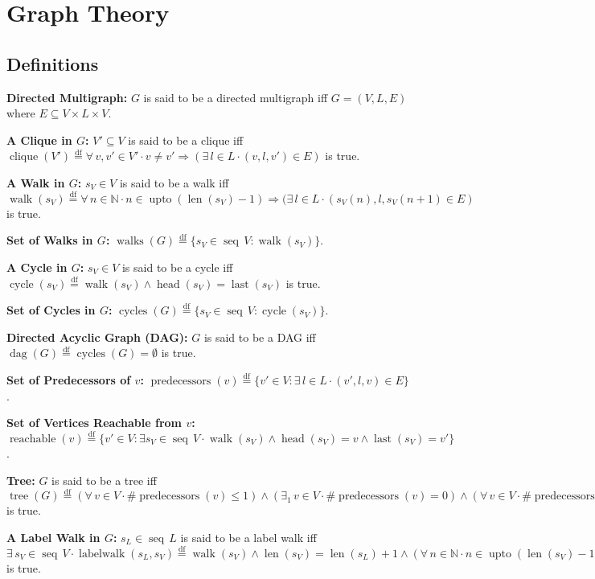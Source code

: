 \documentclass[12pt]{article}
\newcommand{\dfeq}{\stackrel{\text{df}}{=}}
\DeclareMathOperator{\jdag}{dag}
\DeclareMathOperator{\jseq}{seq}
\DeclareMathOperator{\jwalk}{walk}
\DeclareMathOperator{\jlabelwalk}{labelwalk}
\DeclareMathOperator{\jpredecessors}{predecessors}
\DeclareMathOperator{\jreachable}{reachable}
\DeclareMathOperator{\jcycle}{cycle}
\DeclareMathOperator{\jcycles}{cycles}
\DeclareMathOperator{\jclique}{clique}
\DeclareMathOperator{\jtree}{tree}
\DeclareMathOperator{\jwalks}{walks}
\DeclareMathOperator{\jupto}{upto}
\DeclareMathOperator{\jhead}{head}
\DeclareMathOperator{\jlast}{last}
\DeclareMathOperator{\jlen}{len}
\theoremstyle{plain}
\begin{document}
\section{Graph Theory}

\subsection{Definitions}

\textbf{Directed Multigraph:} $G$ is said to be a directed
multigraph iff $G = (V, L, E)$ where $E \subseteq V \times L
\times V$.

\textbf{A Clique in $G$:} $V' \subseteq V$ is said to be a clique iff
$\jclique(V') \dfeq \forall\, v, v' \in V' \cdot v \neq v'
\Rightarrow (\exists\, l \in L \cdot (v, l, v') \in E)$ is true.

\textbf{A Walk in $G$:} $s_V \in V$ is said to be a walk iff
$\jwalk(s_V) \dfeq \forall\, n \in \mathbb{N} \cdot n \in
\jupto(\jlen(s_V) - 1) \Rightarrow (\exists\, l \in L \cdot
(s_V(n), l, s_V(n + 1) \in E)$ is true.

\textbf{Set of Walks in $G$:} $\jwalks(G) \dfeq \{s_V \in
\jseq\, V : \jwalk(s_V)\}$.

\textbf{A Cycle in $G$:} $s_V \in V$ is said to be a cycle iff
$\jcycle(s_V) \dfeq \jwalk(s_V) \land \jhead(s_V) = \jlast(s_V)$
is true. 

\textbf{Set of Cycles in $G$:} $\jcycles(G) \dfeq \{s_V \in
\jseq\, V : \jcycle(s_V)\}$.

\textbf{Directed Acyclic Graph (DAG):} $G$ is said to be a DAG
iff $\jdag(G) \dfeq \jcycles(G) = \emptyset$ is true. 

\textbf{Set of Predecessors of $v$:} $\jpredecessors(v) \dfeq \{v'
\in V : \exists\, l \in L \cdot (v', l, v) \in E\}$.

\textbf{Set of Vertices Reachable from $v$:} $\jreachable(v) \dfeq \{v'
\in V : \exists s_V \in \jseq\, V \cdot \jwalk(s_V)
\land \jhead(s_V) = v \land \jlast(s_V) = v'\}$.

\textbf{Tree:} $G$ is said to be a tree iff $\jtree(G) \dfeq
(\forall\, v \in V \cdot \#\jpredecessors(v) \leq 1) \land
(\exists_{1}\, v \in V \cdot \#\jpredecessors(v) = 0) \land
(\forall\, v \in V \cdot \#\jpredecessors(v) = 0 \Rightarrow
\jreachable(v) = V)$ is true.

\textbf{A Label Walk in $G$:} $s_L \in \jseq\, L$ is said to be
a label walk iff $\exists\, s_V \in \jseq\, V \cdot
\jlabelwalk(s_L, s_V) \dfeq \jwalk(s_V) \land \jlen(s_V) =
\jlen(s_L) + 1 \land (\forall\, n \in \mathbb{N} \cdot n \in
\jupto(\jlen(s_V) - 1) \Rightarrow (s_V(n), s_L(n), s_V(n + 1))
\in E)$ is true.
\end{document}

